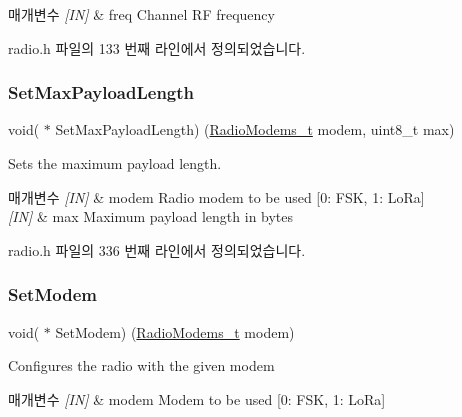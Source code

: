 \begin{DoxyParams}{매개변수}
{\em \mbox{[}\+I\+N\mbox{]}} & freq Channel RF frequency \\
\hline
\end{DoxyParams}


radio.\+h 파일의 133 번째 라인에서 정의되었습니다.

\mbox{\label{struct_radio__s_a19598b798e8b165378b397515c673d1c}} 
\subsubsection{\texorpdfstring{Set\+Max\+Payload\+Length}{SetMaxPayloadLength}}
{\footnotesize\ttfamily void( $\ast$ Set\+Max\+Payload\+Length) (\mbox{\hyperlink{radio_8h_a992ef7a5b7f52975ba7bd8dd97740057}{Radio\+Modems\+\_\+t}} modem, uint8\+\_\+t max)}



Sets the maximum payload length. 


\begin{DoxyParams}{매개변수}
{\em \mbox{[}\+I\+N\mbox{]}} & modem Radio modem to be used \mbox{[}0\+: F\+SK, 1\+: Lo\+Ra\mbox{]} \\
\hline
{\em \mbox{[}\+I\+N\mbox{]}} & max Maximum payload length in bytes \\
\hline
\end{DoxyParams}


radio.\+h 파일의 336 번째 라인에서 정의되었습니다.

\mbox{\label{struct_radio__s_a72519c61045a1c4dd51233ff0e374628}} 
\subsubsection{\texorpdfstring{Set\+Modem}{SetModem}}
{\footnotesize\ttfamily void( $\ast$ Set\+Modem) (\mbox{\hyperlink{radio_8h_a992ef7a5b7f52975ba7bd8dd97740057}{Radio\+Modems\+\_\+t}} modem)}



Configures the radio with the given modem 


\begin{DoxyParams}{매개변수}
{\em \mbox{[}\+I\+N\mbox{]}} & modem Modem to be used \mbox{[}0\+: F\+SK, 1\+: Lo\+Ra\mbox{]} \\
\hline
\end{DoxyParams}


